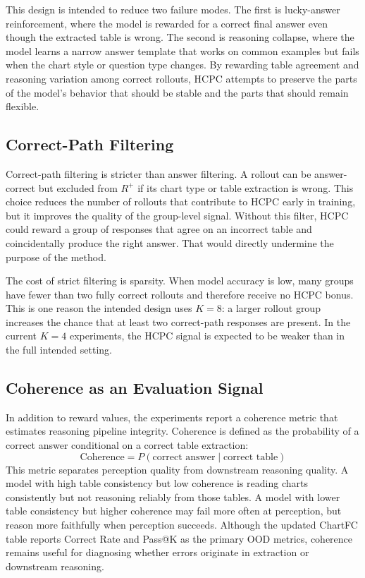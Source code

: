 \documentclass{iutbscthesis}
\begin{document}
This design is intended to reduce two failure modes. The first is lucky-answer reinforcement, where the model is rewarded for a correct final answer even though the extracted table is wrong. The second is reasoning collapse, where the model learns a narrow answer template that works on common examples but fails when the chart style or question type changes. By rewarding table agreement and reasoning variation among correct rollouts, HCPC attempts to preserve the parts of the model's behavior that should be stable and the parts that should remain flexible.

\subsection{Correct-Path Filtering}

Correct-path filtering is stricter than answer filtering. A rollout can be answer-correct but excluded from $R^+$ if its chart type or table extraction is wrong. This choice reduces the number of rollouts that contribute to HCPC early in training, but it improves the quality of the group-level signal. Without this filter, HCPC could reward a group of responses that agree on an incorrect table and coincidentally produce the right answer. That would directly undermine the purpose of the method.

The cost of strict filtering is sparsity. When model accuracy is low, many groups have fewer than two fully correct rollouts and therefore receive no HCPC bonus. This is one reason the intended design uses $K=8$: a larger rollout group increases the chance that at least two correct-path responses are present. In the current $K=4$ experiments, the HCPC signal is expected to be weaker than in the full intended setting.

\subsection{Coherence as an Evaluation Signal}

In addition to reward values, the experiments report a coherence metric that estimates reasoning pipeline integrity. Coherence is defined as the probability of a correct answer conditional on a correct table extraction:
\begin{equation}
    \mathrm{Coherence} = P(\text{correct answer} \mid \text{correct table})
\end{equation}
This metric separates perception quality from downstream reasoning quality. A model with high table consistency but low coherence is reading charts consistently but not reasoning reliably from those tables. A model with lower table consistency but higher coherence may fail more often at perception, but reason more faithfully when perception succeeds. Although the updated ChartFC table reports Correct Rate and Pass@K as the primary OOD metrics, coherence remains useful for diagnosing whether errors originate in extraction or downstream reasoning.
\end{document}
